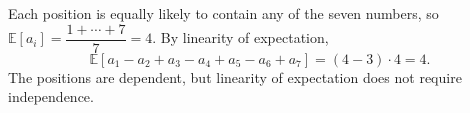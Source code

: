 Each position is equally likely to contain any of the seven numbers, so $\mathbb E[a_i]=\dfrac{1+\cdots+7}{7}=4$. By linearity of expectation,
\[
\mathbb E[a_1-a_2+a_3-a_4+a_5-a_6+a_7]=(4-3)\cdot4=\boxed4.
\]
The positions are dependent, but linearity of expectation does not require independence.
